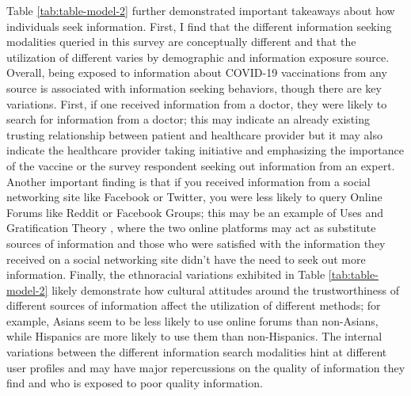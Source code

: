 Table \ref{tab:table-model-2} further demonstrated important takeaways about how
individuals seek information. First, I find that the different information
seeking modalities queried in this survey are conceptually different and that
the utilization of different varies by demographic and information exposure
source. Overall, being exposed to information about COVID-19 vaccinations from
any source is associated with information seeking behaviors, though there are
key variations. First, if one received information from a doctor, they were
likely to search for information from a doctor; this may indicate an already
existing trusting relationship between patient and healthcare provider but it
may also indicate the healthcare provider taking initiative and emphasizing the
importance of the vaccine or the survey respondent seeking out information from
an expert. Another important finding is that if you received information from a
social networking site like Facebook or Twitter, you were less likely to query
Online Forums like Reddit or Facebook Groups; this may be an example of Uses and
Gratification Theory \citep{blumlerUsesMassCommunications1974}, where the two
online platforms may act as substitute sources of information and those who were
satisfied with the information they received on a social networking site didn't
have the need to seek out more information. Finally, the ethnoracial variations
exhibited in Table \ref{tab:table-model-2} likely demonstrate how cultural
attitudes around the trustworthiness of different sources of information affect
the utilization of different methods; for example, Asians seem to be less likely
to use online forums than non-Asians, while Hispanics are more likely to use
them than non-Hispanics. The internal variations between the different
information search modalities hint at different user profiles and may have major
repercussions on the quality of information they find and who is exposed to poor
quality information.

